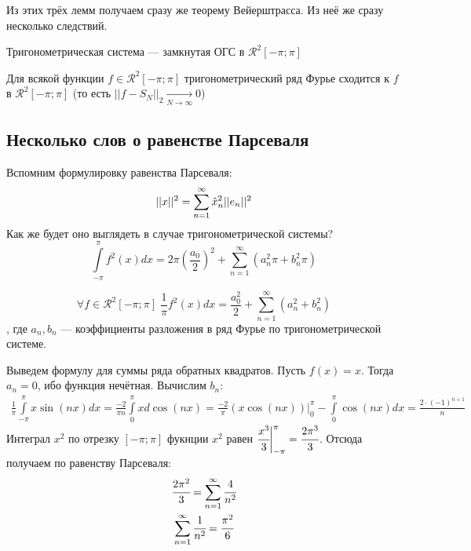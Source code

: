 \documentclass[a4paper, 12pt]{article}
\begin{document}
Из этих трёх лемм получаем сразу же теорему Вейерштрасса. Из неё же сразу несколько следствий.
\begin{Consequence}
	Тригонометрическая система --- замкнутая ОГС в $\mathcal{R}^2[-\pi;\pi]$
\end{Consequence}
\begin{Consequence}
	Для всякой функции $f \in \mathcal{R}^2[-\pi;\pi]$ тригонометрический ряд Фурье сходится к $f$ в $\mathcal{R}^2[-\pi; \pi]$ (то есть $|| f - S_N||_2\underset{N \to \infty}{\longrightarrow} 0$)
\end{Consequence}
\subsection{Несколько слов о равенстве Парсеваля}
Вспомним формулировку равенства Парсеваля:
$$
	||x||^2 = \sum\limits_{n=1}^{\infty} \hat{x}_n^2 ||e_n||^2
$$
Как же будет оно выглядеть в случае тригонометрической системы? 
$$\int\limits_{-\pi}^{\pi} f^2(x)dx =2\pi\left( \frac{a_0}{2}\right)^2 + \sum\limits_{n=1}^{\infty}(a_n^2\pi + b_n^2\pi)
$$
\begin{Consequence}
	$$
	\forall f \in \mathcal{R}^2[-\pi;\pi]\; \frac{1}{\pi}f^2(x)dx = \frac{a_0^2}{2} + \sum\limits_{n=1}^{\infty}(a_n^2 + b_n^2)
	$$, где $a_n, b_n$ --- коэффициенты разложения в ряд Фурье по тригонометрической системе.
\end{Consequence}
\begin{Examples}
	Выведем формулу для суммы ряда обратных квадратов. Пусть $f(x) = x$. Тогда $a_n = 0$, ибо функция нечётная. Вычислим $b_n$:
	\begin{gather*}
		\frac{1}{\pi} \int \limits_{-\pi}^{\pi} x \sin(nx)dx = \frac{-2}{\pi n} \int \limits_{0}^{\pi}x d\cos(nx) = \frac{-2}{\pi}\left(x \cos(nx)\right)\biggr|_0^{\pi} - \int \limits_{0}^{\pi}\cos(nx) dx = \frac{2\cdot(-1)^{n+1}}{n}
	\end{gather*}
	Интеграл $x^2$ по отрезку $[-\pi;\pi]$ фукнции $x^2$ равен $\cfrac{x^3}{3}\biggr|_{-\pi}^{\pi} = \cfrac{2\pi^3}{3}$. Отсюда получаем по равенству Парсеваля:
	\begin{gather*}
		\cfrac{2\pi^2}{3} = \sum\limits_{n=1}^{\infty} \cfrac{4}{n^2}\\
		\sum\limits_{n=1}^{\infty} \cfrac{1}{n^2} = \cfrac{\pi^2}{6}
	\end{gather*}
\end{Examples}
\end{document}
